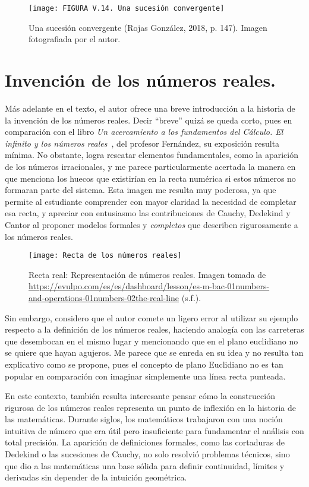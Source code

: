 \documentclass[a4paper,10pt]{article}
\begin{document}
\begin{figure}[h]
    \centering
    \texttt{[image: FIGURA V.14. Una sucesión convergente]}
    \caption{Una sucesión convergente (Rojas González, 2018, p. 147). Imagen fotografiada por el autor.}
    \label{fig: sucesion_convergente}
\end{figure}

\section*{Invención de los números reales.}

Más adelante en el texto, el autor ofrece una breve introducción a la historia de la invención de los números reales. Decir “breve” quizá se queda corto, pues en comparación con el libro \textit{Un acercamiento a los fundamentos del Cálculo. El infinito y los números reales}~\cite{fernández}, del profesor Fernández, su exposición resulta mínima. No obstante, logra rescatar elementos fundamentales, como la aparición de los números irracionales, y me parece particularmente acertada la manera en que menciona los huecos que existirían en la recta numérica si estos números no formaran parte del sistema. Esta imagen me resulta muy poderosa, ya que permite al estudiante comprender con mayor claridad la necesidad de completar esa recta, y apreciar con entusiasmo las contribuciones de Cauchy, Dedekind y Cantor al proponer modelos formales y \textit{completos} que describen rigurosamente a los números reales.

\begin{figure}[h]
    \centering
    \texttt{[image: Recta de los números reales]}
    {\caption*{\footnotesize Recta real: Representación de números reales. Imagen tomada de \url{https://evulpo.com/es/es/dashboard/lesson/es-m-bac-01numbers-and-operations-01numbers-02the-real-line}  (s.f.).}}
    \label{fig:recta_reales}
\end{figure}

Sin embargo, considero que el autor comete un ligero error al utilizar su ejemplo respecto a la definición de los números reales, haciendo analogía con las carreteras que desembocan en el mismo lugar y mencionando que en el plano euclidiano no se quiere que hayan agujeros. Me parece que se enreda en su idea y no resulta tan explicativo como se propone, pues el concepto de plano Euclidiano no es tan popular en comparación con imaginar simplemente una línea recta punteada. 

En este contexto, también resulta interesante pensar cómo la construcción rigurosa de los números reales representa un punto de inflexión en la historia de las matemáticas. Durante siglos, los matemáticos trabajaron con una noción intuitiva de número que era útil pero insuficiente para fundamentar el análisis con total precisión. La aparición de definiciones formales, como las cortaduras de Dedekind o las sucesiones de Cauchy, no solo resolvió problemas técnicos, sino que dio a las matemáticas una base sólida para definir continuidad, límites y derivadas sin depender de la intuición geométrica.
\end{document}
